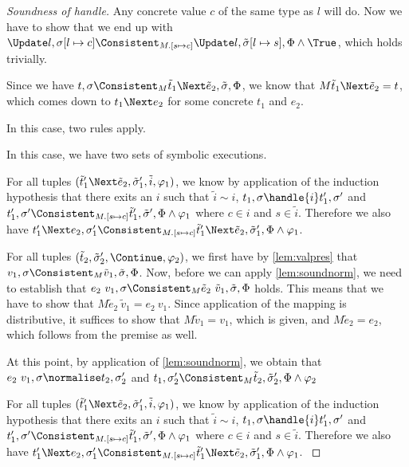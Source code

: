 \begin{proof}[Soundness of handle]
{Any concrete value $c$ of the same type as $l$ will do. Now we have to show that we end up with $\Update l,\sigma[l\mapsto c]\Consistent_{M.[s\mapsto c]}\Update l,\tilde{\sigma}[l\mapsto s],\Phi\land\True$, which holds trivially.
}


 {
Since we have $t,\sigma\Consistent_M\tilde{t}_1\Next \tilde{e}_2,\tilde{\sigma},\Phi$, we know that $M \tilde{t}_1\Next \tilde{e}_2=t$, which comes down to $t_1\Next e_2$ for some concrete $t_1$ and $e_2$.

 In this case, two rules apply.\\


{
In this case, we have two sets of symbolic executions.

For all tuples $(\tilde{t}_1'\Next \tilde{e}_2,\tilde{\sigma}_1',\tilde{i},\phi_1)$, we know by application of the induction hypothesis that
there exits an $i$ such that $\tilde{i}\sim i$, $t_1,\sigma\handle{i}t_1',\sigma'$ and
$t_1',\sigma'\Consistent_{M.[s\mapsto c]}\tilde{t}_1',\tilde{\sigma}',\Phi\land\phi_1$ where $c\in i$ and $s\in \tilde{i}$.
Therefore we also have $t_1'\Next e_2,\sigma_1'\Consistent_{M.[s\mapsto c]}\tilde{t}_1'\Next \tilde{e}_2,\tilde{\sigma}_1',\Phi\land\phi_1$.

For all tuples $(\tilde{t}_2,\tilde{\sigma}_2',\Continue,\phi_2)$, we first have by \cref{lem:valpres} that
$v_1,\sigma\Consistent_M\tilde{v}_1,\tilde{\sigma},\Phi$.
Now, before we can apply \cref{lem:soundnorm}, we need to establish that
$e_2\ v_1,\sigma\Consistent_M\tilde{e}_2\ \tilde{v}_1,\tilde{\sigma},\Phi$ holds.
This means that we have to show that $M \tilde{e}_2\ \tilde{v}_1 = e_2\ v_1$.
Since application of the mapping is distributive, it suffices to show that $M\tilde{v}_1=v_1$, which is given,
and $M\tilde{e}_2=e_2$, which follows from the premise as well.

At this point, by application of \cref{lem:soundnorm}, we obtain that $e_2\ v_1,\sigma\normalise t_2,\sigma_2'$
and $t_1,\sigma_2'\Consistent_M\tilde{t}_2,\tilde{\sigma}_2',\Phi\land\phi_2$
}
%
{
For all tuples $(\tilde{t}_1'\Next \tilde{e}_2,\tilde{\sigma}_1',\tilde{i},\phi_1)$, we know by application of the induction hypothesis that
there exits an $i$ such that $\tilde{i}\sim i$, $t_1,\sigma\handle{i}t_1',\sigma'$ and
$t_1',\sigma'\Consistent_{M.[s\mapsto c]}\tilde{t}_1',\tilde{\sigma}',\Phi\land\phi_1$ where $c\in i$ and $s\in \tilde{i}$.
Therefore we also have $t_1'\Next e_2,\sigma_1'\Consistent_{M.[s\mapsto c]}\tilde{t}_1'\Next \tilde{e}_2,\tilde{\sigma}_1',\Phi\land\phi_1$.
}
}


\end{proof}
